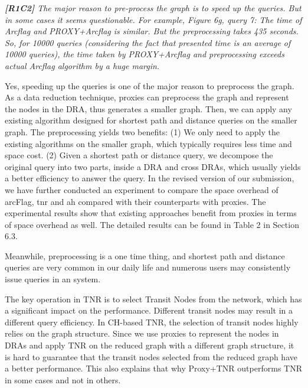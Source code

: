 \documentclass[11pt]{letter}
\newcommand{\svs}{\vspace{0.36ex}}
\newcommand{\ah}{{\sc ah}\xspace}
\newcommand{\arcflag}{{\sc arcFlag}\xspace}
\newcommand{\tnr}{{\sc tnr}\xspace}
\begin{document}
\noindent
{\em
{\bf [R1C2]}  The major reason to pre-process the graph is to speed up the queries. But in some cases it seems questionable. For example, Figure 6g, query 7: The time of Arcflag and PROXY+Arcflag
is similar. But the preprocessing takes 435 seconds. So, for 10000 queries (considering the fact that presented time is an average of 10000 queries), the time taken by PROXY+Arcflag and preprocessing exceeds actual Arcflag algorithm by a huge margin.}
\svs

Yes, speeding up the queries is one of the major reason to preprocess the graph. As a data reduction technique, proxies can preprocess the graph and represent the nodes in the DRA, thus generates a smaller graph. Then, we can apply any existing algorithm designed for shortest path and distance queries on the smaller graph. The preprocessing yields two benefits: (1) We only need to apply the existing algorithms on the smaller graph, which typically requires less time and space cost. (2) Given a shortest path or distance query, we decompose the original query into two parts, inside a DRA and cross DRAs, which usually yields a better efficiency to answer the query. In the revised version of our submission, we have further conducted an experiment to compare the space overhead of \arcflag, \tnr and \ah compared with their counterparts with proxies. The experimental results show that existing approaches benefit from proxies in terms of space overhead as well. The detailed results can be found in Table 2 in Section 6.3.

Meanwhile, preprocessing is a one time thing, and shortest path and distance queries are very common in our daily life and numerous users may consistently issue queries in an system.



\svs
The key operation in TNR is to select Transit Nodes from the network, which has a significant impact on the performance. Different transit nodes may result in a different query efficiency. In CH-based TNR, the selection of transit nodes highly relies on the graph structure. Since we use proxies to represent the nodes in DRAs and apply TNR on the reduced graph with a different graph structure, it is hard to guarantee that the transit nodes selected from the reduced graph have a better performance. This also explains that why Proxy+TNR outperforms TNR in some cases and not in others. 
\end{document}
